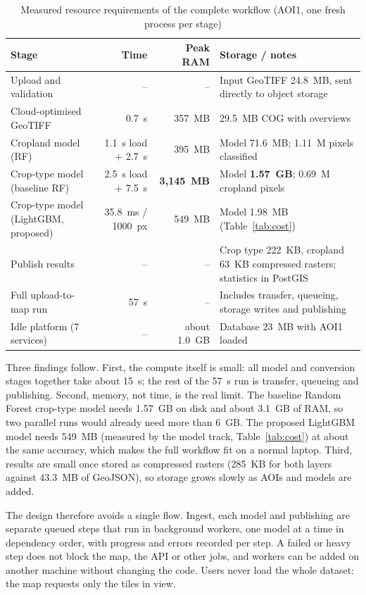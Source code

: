 \begin{table}[htbp]
\centering\small
\caption{Measured resource requirements of the complete workflow (AOI1, one fresh process per stage)}
\label{tab:resources}
\begin{tabularx}{\textwidth}{L{3.6cm} r r Y}
\toprule
\textbf{Stage} & \textbf{Time} & \textbf{Peak RAM} & \textbf{Storage / notes}\\
\midrule
Upload and validation & -- & -- & Input GeoTIFF 24.8~MB, sent directly to object storage\\
Cloud-optimised GeoTIFF & 0.7~s & 357~MB & 29.5~MB COG with overviews\\
Cropland model (RF) & 1.1~s load + 2.7~s & 395~MB & Model 71.6~MB; 1.11~M pixels classified\\
Crop-type model (baseline RF) & 2.5~s load + 7.5~s & \textbf{3,145~MB} & Model \textbf{1.57~GB}; 0.69~M cropland pixels\\
Crop-type model (LightGBM, proposed) & 35.8~ms / 1000~px & 549~MB & Model 1.98~MB (Table~\ref{tab:cost})\\
Publish results & -- & -- & Crop type 222~KB, cropland 63~KB compressed rasters; statistics in PostGIS\\
Full upload-to-map run & 57~s & -- & Includes transfer, queueing, storage writes and publishing\\
Idle platform (7 services) & -- & about 1.0~GB & Database 23~MB with AOI1 loaded\\
\bottomrule
\end{tabularx}
\end{table}

Three findings follow. First, the compute itself is small: all model and conversion stages together
take about 15~s; the rest of the 57~s run is transfer, queueing and publishing. Second, memory, not
time, is the real limit. The baseline Random Forest crop-type model needs 1.57~GB on disk and about
3.1~GB of RAM, so two parallel runs would already need more than 6~GB. The proposed LightGBM model
needs 549~MB (measured by the model track, Table~\ref{tab:cost}) at about the same accuracy, which makes the full workflow fit on a normal laptop.
Third, results are small once stored as compressed rasters (285~KB for both layers against 43.3~MB
of GeoJSON), so storage grows slowly as AOIs and models are added.

The design therefore avoids a single flow. Ingest, each model and publishing are separate queued
steps that run in background workers, one model at a time in dependency order, with progress and
errors recorded per step. A failed or heavy step does not block the map, the API or other jobs, and
workers can be added on another machine without changing the code. Users never load the whole
dataset: the map requests only the tiles in view.

